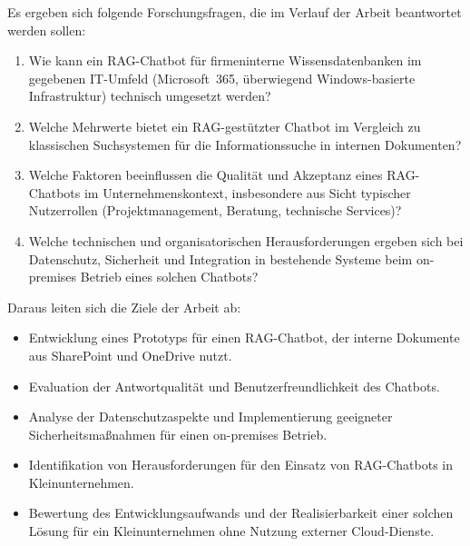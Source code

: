 Es ergeben sich folgende Forschungsfragen, die im Verlauf der Arbeit beantwortet werden sollen:

\begin{enumerate}
    \item Wie kann ein RAG-Chatbot für firmeninterne Wissensdatenbanken im gegebenen IT-Umfeld (Microsoft~365, überwiegend Windows-basierte Infrastruktur) technisch umgesetzt werden?

    \item Welche Mehrwerte bietet ein RAG-gestützter Chatbot im Vergleich zu klassischen Suchsystemen für die Informationssuche in internen Dokumenten?

    \item Welche Faktoren beeinflussen die Qualität und Akzeptanz eines RAG-Chatbots im Unternehmenskontext, insbesondere aus Sicht typischer Nutzerrollen (Projektmanagement, Beratung, technische Services)?

    \item Welche technischen und organisatorischen Herausforderungen ergeben sich bei Datenschutz, Sicherheit und Integration in bestehende Systeme beim on-premises Betrieb eines solchen Chatbots?
\end{enumerate}

Daraus leiten sich die Ziele der Arbeit ab:

\begin{itemize}
    \item Entwicklung eines Prototyps für einen RAG-Chatbot, der interne Dokumente aus SharePoint und OneDrive nutzt.
    \item Evaluation der Antwortqualität und Benutzerfreundlichkeit des Chatbots.
    \item Analyse der Datenschutzaspekte und Implementierung geeigneter Sicherheitsmaßnahmen für einen on-premises Betrieb.
    \item Identifikation von Herausforderungen für den Einsatz von RAG-Chatbots in Kleinunternehmen.
    \item Bewertung des Entwicklungsaufwands und der Realisierbarkeit einer solchen Lösung für ein Kleinunternehmen ohne Nutzung externer Cloud-Dienste.
\end{itemize}

